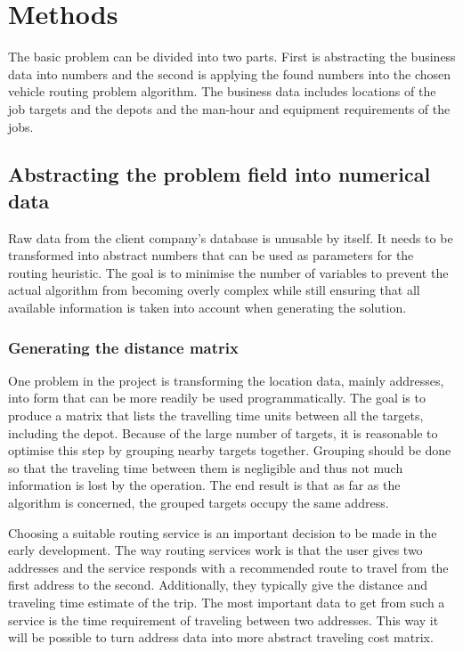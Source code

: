 \chapter{Methods}
\label{chapter:methods}

The basic problem can be divided into two parts. First is abstracting the business data into numbers and the second is applying the found numbers into the chosen vehicle routing problem algorithm. The business data includes locations of the job targets and the depots and the man-hour and equipment requirements of the jobs.  

\section{Abstracting the problem field into numerical data}

Raw data from the client company's database is unusable by itself. It needs to be transformed into abstract numbers that can be used as parameters for the routing heuristic. The goal is to minimise the number of variables to prevent the actual algorithm from becoming overly complex while still ensuring that all available information is taken into account when generating the solution. 

\subsection{Generating the distance matrix}

One problem in the project is transforming the location data, mainly addresses, into form that can be more readily be used programmatically. The goal is to produce a matrix that lists the travelling time units between all the targets, including the depot. Because of the large number of targets, it is reasonable to optimise this step by grouping nearby targets together. Grouping should be done so that the traveling time between them is negligible and thus not much information is lost by the operation. The end result is that as far as the algorithm is concerned, the grouped targets occupy the same address.

Choosing a suitable routing service is an important decision to be made in the early development. The way routing services work is that the user gives two addresses and the service responds with a recommended route to travel from the first address to the second. Additionally, they typically give the distance and traveling time estimate of the trip. The most important data to get from such a service is the time requirement of traveling between two addresses. This way it will be possible to turn address data into more abstract traveling cost matrix.

